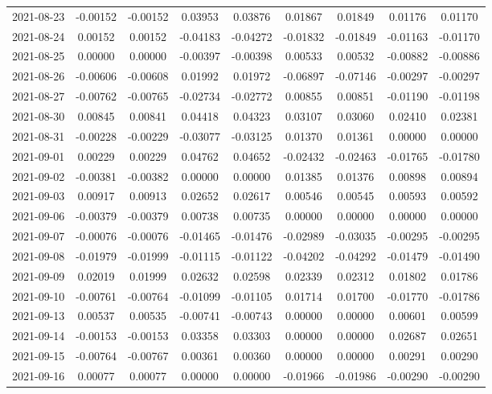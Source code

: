 {\begin{footnotesize}
\begin{longtable}{lcccccccc}
2021-08-23 & -0.00152 & -0.00152 & 0.03953 & 0.03876 & 0.01867 & 0.01849 & 0.01176 & 0.01170 \\
2021-08-24 & 0.00152 & 0.00152 & -0.04183 & -0.04272 & -0.01832 & -0.01849 & -0.01163 & -0.01170 \\
2021-08-25 & 0.00000 & 0.00000 & -0.00397 & -0.00398 & 0.00533 & 0.00532 & -0.00882 & -0.00886 \\
2021-08-26 & -0.00606 & -0.00608 & 0.01992 & 0.01972 & -0.06897 & -0.07146 & -0.00297 & -0.00297 \\
2021-08-27 & -0.00762 & -0.00765 & -0.02734 & -0.02772 & 0.00855 & 0.00851 & -0.01190 & -0.01198 \\
2021-08-30 & 0.00845 & 0.00841 & 0.04418 & 0.04323 & 0.03107 & 0.03060 & 0.02410 & 0.02381 \\
2021-08-31 & -0.00228 & -0.00229 & -0.03077 & -0.03125 & 0.01370 & 0.01361 & 0.00000 & 0.00000 \\
2021-09-01 & 0.00229 & 0.00229 & 0.04762 & 0.04652 & -0.02432 & -0.02463 & -0.01765 & -0.01780 \\
2021-09-02 & -0.00381 & -0.00382 & 0.00000 & 0.00000 & 0.01385 & 0.01376 & 0.00898 & 0.00894 \\
2021-09-03 & 0.00917 & 0.00913 & 0.02652 & 0.02617 & 0.00546 & 0.00545 & 0.00593 & 0.00592 \\
2021-09-06 & -0.00379 & -0.00379 & 0.00738 & 0.00735 & 0.00000 & 0.00000 & 0.00000 & 0.00000 \\
2021-09-07 & -0.00076 & -0.00076 & -0.01465 & -0.01476 & -0.02989 & -0.03035 & -0.00295 & -0.00295 \\
2021-09-08 & -0.01979 & -0.01999 & -0.01115 & -0.01122 & -0.04202 & -0.04292 & -0.01479 & -0.01490 \\
2021-09-09 & 0.02019 & 0.01999 & 0.02632 & 0.02598 & 0.02339 & 0.02312 & 0.01802 & 0.01786 \\
2021-09-10 & -0.00761 & -0.00764 & -0.01099 & -0.01105 & 0.01714 & 0.01700 & -0.01770 & -0.01786 \\
2021-09-13 & 0.00537 & 0.00535 & -0.00741 & -0.00743 & 0.00000 & 0.00000 & 0.00601 & 0.00599 \\
2021-09-14 & -0.00153 & -0.00153 & 0.03358 & 0.03303 & 0.00000 & 0.00000 & 0.02687 & 0.02651 \\
2021-09-15 & -0.00764 & -0.00767 & 0.00361 & 0.00360 & 0.00000 & 0.00000 & 0.00291 & 0.00290 \\
2021-09-16 & 0.00077 & 0.00077 & 0.00000 & 0.00000 & -0.01966 & -0.01986 & -0.00290 & -0.00290 \\

\end{longtable}
\end{footnotesize}}
